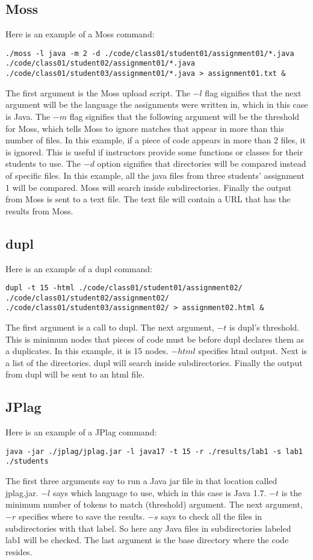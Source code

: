 \documentclass[12pt]{article}
\begin{document}
		\subsection{Moss}
			Here is an example of a Moss command:
			\begin{lstlisting}[breaklines=true]
./moss -l java -m 2 -d ./code/class01/student01/assignment01/*.java ./code/class01/student02/assignment01/*.java ./code/class01/student03/assignment01/*.java > assignment01.txt &
			\end{lstlisting}
			\noindent The first argument is the Moss upload script. The $-l$ flag signifies that the next argument will be the language the assignments were written in, which in this case is Java. The $-m$ flag signifies that the following argument will be the threshold for Moss, which tells Moss to ignore matches that appear in more than this number of files. In this example, if a piece of code appears in more than 2 files, it is ignored. This is useful if instructors provide some functions or classes for their students to use. The $-d$ option signifies that directories will be compared instead of specific files. In this example, all the java files from three students' assignment 1 will be compared. Moss will search inside subdirectories. Finally the output from Moss is sent to a text file. The text file will contain a URL that has the results from Moss.
			
		\subsection{dupl}
			Here is an example of a dupl command:
			\begin{lstlisting}[breaklines=true]
dupl -t 15 -html ./code/class01/student01/assignment02/ ./code/class01/student02/assignment02/ ./code/class01/student03/assignment02/ > assignment02.html &
			\end{lstlisting}
			\noindent The first argument is a call to dupl. The next argument, $-t$ is dupl's threshold. This is minimum nodes that pieces of code must be before dupl declares them as a duplicates. In this example, it is 15 nodes. $-html$ specifies html output. Next is a list of the directories. dupl will search inside subdirectories. Finally the output from dupl will be sent to an html file.
			
		\subsection{JPlag}
			Here is an example of a JPlag command:
			\begin{lstlisting}[breaklines=true]		
java -jar ./jplag/jplag.jar -l java17 -t 15 -r ./results/lab1 -s lab1 ./students
			\end{lstlisting}
			\noindent The first three arguments say to run a Java jar file in that location called jplag.jar. $-l$ says which language to use, which in this case is Java 1.7. $-t$ is the minimum number of tokens to match (threshold) argument. The next argument, $-r$ specifies where to save the results. $-s$ says to check all the files in subdirectories with that label. So here any Java files in subdirectories labeled lab1 will be checked. The last argument is the base directory where the code resides.
			
\end{document}
